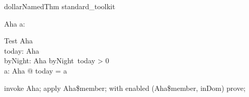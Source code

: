 \begin{zsection}
   \SECTION dollarNamedThm \parents standard\_toolkit
\end{zsection}

\begin{schema}{Aha}
   a: \nat
\end{schema}

\begin{schema}{Test}
   \Delta Aha \\
   today: Aha \\
   byNight: Aha \pfun \nat
\where
   byNight~today > 0 \\
   \exists a: Aha @ today = a
\end{schema}

\begin{zproof}
invoke \Delta Aha;
apply Aha\$member;
with enabled (Aha\$member, inDom) prove;
\end{zproof}


